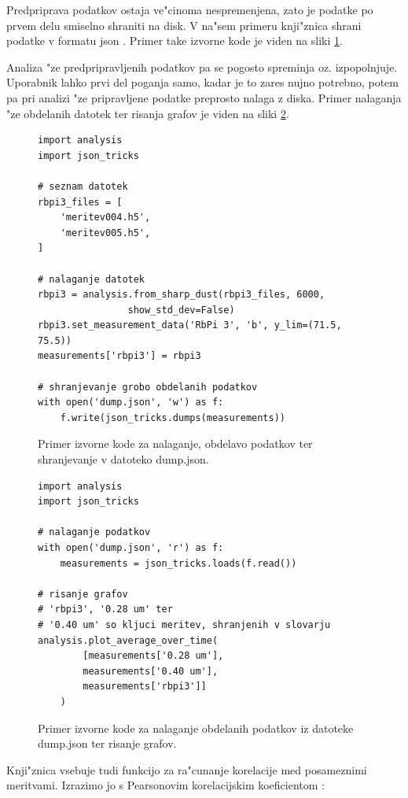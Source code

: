 \documentclass[12pt,a4paper]{article}
\begin{document}
Predpriprava podatkov ostaja ve"cinoma nespremenjena, zato je podatke po prvem delu smiselno shraniti na disk. V na"sem primeru knji"znica shrani podatke v formatu json \cite{json}. Primer take izvorne kode je viden na sliki \ref{dump-data}.

Analiza "ze predpripravljenih podatkov pa se pogosto spreminja oz. izpopolnjuje. Uporabnik lahko prvi del poganja samo, kadar je to zares nujno potrebno, potem pa pri analizi "ze pripravljene podatke preprosto nalaga z diska. Primer nalaganja "ze obdelanih datotek ter risanja grafov je viden na sliki \ref{plot-data}.

\begin{figure}[H]
	\begin{lstlisting}[frame=single]
import analysis
import json_tricks

# seznam datotek
rbpi3_files = [
	'meritev004.h5',
	'meritev005.h5',
]

# nalaganje datotek
rbpi3 = analysis.from_sharp_dust(rbpi3_files, 6000,
				show_std_dev=False)
rbpi3.set_measurement_data('RbPi 3', 'b', y_lim=(71.5, 75.5))
measurements['rbpi3'] = rbpi3

# shranjevanje grobo obdelanih podatkov
with open('dump.json', 'w') as f:
	f.write(json_tricks.dumps(measurements))
	\end{lstlisting}
	\caption{Primer izvorne kode za nalaganje, obdelavo podatkov ter shranjevanje v datoteko dump.json.}
	\label{dump-data}
\end{figure}

\begin{figure}[H]
	\begin{lstlisting}[frame=single]
import analysis
import json_tricks

# nalaganje podatkov
with open('dump.json', 'r') as f:
	measurements = json_tricks.loads(f.read())

# risanje grafov
# 'rbpi3', '0.28 um' ter
# '0.40 um' so kljuci meritev, shranjenih v slovarju
analysis.plot_average_over_time(
		[measurements['0.28 um'],
		measurements['0.40 um'],
		measurements['rbpi3']]
	)

	\end{lstlisting}
	\caption{Primer izvorne kode za nalaganje obdelanih podatkov iz datoteke dump.json ter risanje grafov.}
	\label{plot-data}
\end{figure}

Knji"znica vsebuje tudi funkcijo za ra"cunanje korelacije med posameznimi meritvami. Izrazimo jo s Pearsonovim korelacijskim koeficientom \cite{correlation}:
\end{document}
